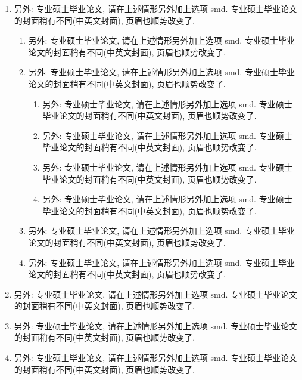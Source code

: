 \begin{enumerate}
  \item 另外: 专业硕士毕业论文, 请在上述情形另外加上选项 smd. 专业硕士毕业论文的封面稍有不同(中英文封面), 页眉也顺势改变了.
    \begin{enumerate}
      \item 另外: 专业硕士毕业论文, 请在上述情形另外加上选项 smd. 专业硕士毕业论文的封面稍有不同(中英文封面), 页眉也顺势改变了.
      \item 另外: 专业硕士毕业论文, 请在上述情形另外加上选项 smd. 专业硕士毕业论文的封面稍有不同(中英文封面), 页眉也顺势改变了.
        \begin{enumerate}
          \item 另外: 专业硕士毕业论文, 请在上述情形另外加上选项 smd. 专业硕士毕业论文的封面稍有不同(中英文封面), 页眉也顺势改变了.
          \item 另外: 专业硕士毕业论文, 请在上述情形另外加上选项 smd. 专业硕士毕业论文的封面稍有不同(中英文封面), 页眉也顺势改变了.
          \item 另外: 专业硕士毕业论文, 请在上述情形另外加上选项 smd. 专业硕士毕业论文的封面稍有不同(中英文封面), 页眉也顺势改变了.
          \item 另外: 专业硕士毕业论文, 请在上述情形另外加上选项 smd. 专业硕士毕业论文的封面稍有不同(中英文封面), 页眉也顺势改变了.
        \end{enumerate}
      \item 另外: 专业硕士毕业论文, 请在上述情形另外加上选项 smd. 专业硕士毕业论文的封面稍有不同(中英文封面), 页眉也顺势改变了.
      \item 另外: 专业硕士毕业论文, 请在上述情形另外加上选项 smd. 专业硕士毕业论文的封面稍有不同(中英文封面), 页眉也顺势改变了.
    \end{enumerate}
  \item 另外: 专业硕士毕业论文, 请在上述情形另外加上选项 smd. 专业硕士毕业论文的封面稍有不同(中英文封面), 页眉也顺势改变了.
  \item 另外: 专业硕士毕业论文, 请在上述情形另外加上选项 smd. 专业硕士毕业论文的封面稍有不同(中英文封面), 页眉也顺势改变了.
  \item 另外: 专业硕士毕业论文, 请在上述情形另外加上选项 smd. 专业硕士毕业论文的封面稍有不同(中英文封面), 页眉也顺势改变了.
\end{enumerate}

